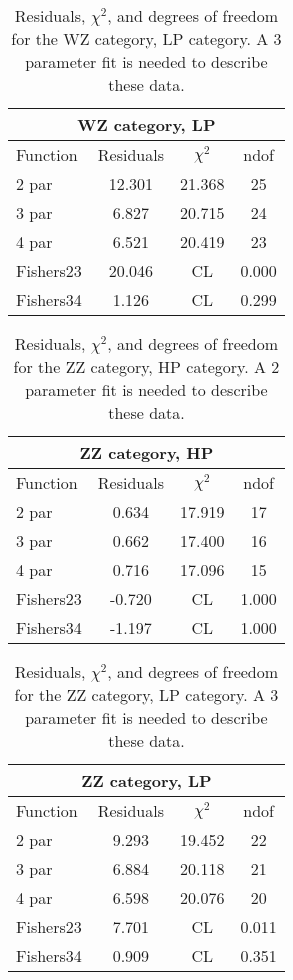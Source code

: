 \begin{table}[htb]
\centering
\begin{tabular}{|l c c c |}
\hline
\multicolumn{4}{|c|}{WZ category, LP}\\
\hline
Function & Residuals & $\chi^2$ & ndof \\
\hline
2 par & 12.301 & 21.368 & 25 \\
3 par & 6.827 & 20.715 & 24 \\
4 par & 6.521 & 20.419 & 23 \\
\hline
\hline
Fishers23  & 20.046 & CL & 0.000\\
Fishers34  & 1.126 & CL & 0.299\\
\hline
\end{tabular}
\caption{Residuals, $\chi^{2}$, and degrees of freedom for the WZ category, LP category. A 3 parameter fit is needed to describe these data.}
\label{tab:WZ category, LP}
\end{table}
\begin{table}[htb]
\centering
\begin{tabular}{|l c c c |}
\hline
\multicolumn{4}{|c|}{ZZ category, HP}\\
\hline
Function & Residuals & $\chi^2$ & ndof \\
\hline
2 par & 0.634 & 17.919 & 17 \\
3 par & 0.662 & 17.400 & 16 \\
4 par & 0.716 & 17.096 & 15 \\
\hline
\hline
Fishers23  & -0.720 & CL & 1.000\\
Fishers34  & -1.197 & CL & 1.000\\
\hline
\end{tabular}
\caption{Residuals, $\chi^{2}$, and degrees of freedom for the ZZ category, HP category. A 2 parameter fit is needed to describe these data.}
\label{tab:ZZ category, HP}
\end{table}
\begin{table}[htb]
\centering
\begin{tabular}{|l c c c |}
\hline
\multicolumn{4}{|c|}{ZZ category, LP}\\
\hline
Function & Residuals & $\chi^2$ & ndof \\
\hline
2 par & 9.293 & 19.452 & 22 \\
3 par & 6.884 & 20.118 & 21 \\
4 par & 6.598 & 20.076 & 20 \\
\hline
\hline
Fishers23  & 7.701 & CL & 0.011\\
Fishers34  & 0.909 & CL & 0.351\\
\hline
\end{tabular}
\caption{Residuals, $\chi^{2}$, and degrees of freedom for the ZZ category, LP category. A 3 parameter fit is needed to describe these data.}
\label{tab:ZZ category, LP}
\end{table}
